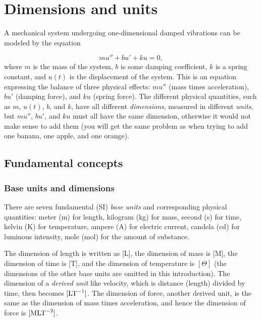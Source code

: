 \documentclass[graybox,envcountchap,sectrefs,final]{svmonodo}
\begin{document}


\tableofcontents


\vspace{1cm} %

\mainmatter





\chapter{Dimensions and units}
\label{scale:dimunit}


A mechanical system undergoing one-dimensional damped vibrations can be
modeled by the equation

\begin{equation}
mu'' + bu' + ku = 0,
\label{scale:dimunit:eq:u}
\end{equation}
where $m$ is the mass of the system, $b$ is some damping coefficient,
$k$ is a spring constant, and $u(t)$ is the displacement of the
system.  This is an equation expressing the balance of three physical
effects: $mu''$ (mass times acceleration), $bu'$ (damping force), and
$ku$ (spring force).  The different physical quantities, such as $m$,
$u(t)$, $b$, and $k$, have all different \emph{dimensions}, measured in
different \emph{units}, but $mu''$, $bu'$, and $ku$ must all have the same
dimension, otherwise it would not make sense to add them (you will get
the same problem as when trying to add one banana, one apple, and one
orange).

\section{Fundamental concepts}

\subsection{Base units and dimensions}



There are seven fundamental (SI) \emph{base units} and corresponding
physical quantities:
meter (m) for length,
kilogram (kg) for mass,
second (s) for time,
kelvin (K) for temperature,
ampere (A) for electric current,
candela (cd) for luminous intensity,
mole (mol) for the amount of substance.

The dimension of length is written as [L], the dimension of mass is
[M], the dimension of time is [T], and the dimension of temperature is
$[\Theta]$ (the dimensions of the other base units are omitted in
this introduction). The dimension of a \emph{derived unit} like velocity, which is
distance (length) divided by time, then becomes $[\hbox{LT}^{-1}]$.
The dimension of force, another derived unit, is the same as the
dimension of mass times acceleration, and hence the dimension of force is
$[\hbox{MLT}^{-2}]$.
\end{document}
